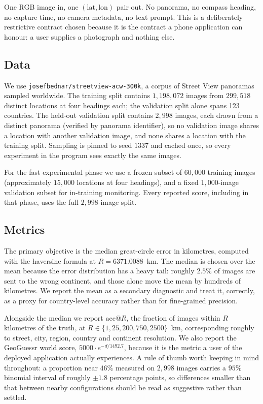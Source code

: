\documentclass[11pt,a4paper]{article}
\begin{document}
One RGB image in, one $(\mathrm{lat}, \mathrm{lon})$ pair out. No panorama, no compass
heading, no capture time, no camera metadata, no text prompt. This is a deliberately
restrictive contract chosen because it is the contract a phone application can honour:
a user supplies a photograph and nothing else.

\subsection{Data}

We use \texttt{josefbednar/streetview-acw-300k}, a corpus of Street View panoramas sampled
worldwide. The training split contains $1{,}198{,}072$ images from $299{,}518$ distinct
locations at four headings each; the validation split alone spans 123 countries. The
held-out validation split contains $2{,}998$ images, each drawn from a distinct panorama
(verified by panorama identifier), so no validation image shares a location with another
validation image, and none shares a location with the training split. Sampling is pinned to
seed $1337$ and cached once, so every experiment in the program sees exactly the same
images.

For the fast experimental phase we use a frozen subset of $60{,}000$ training images
(approximately $15{,}000$ locations at four headings), and a fixed $1{,}000$-image
validation subset for in-training monitoring. Every reported score, including in that phase,
uses the full $2{,}998$-image split.

\subsection{Metrics}

The primary objective is the median great-circle error in kilometres, computed with the
haversine formula at $R = 6371.0088$~km. The median is chosen over the mean because the
error distribution has a heavy tail: roughly $2.5\%$ of images are sent to the wrong
continent, and those alone move the mean by hundreds of kilometres. We report the mean as a
secondary diagnostic and treat it, correctly, as a proxy for country-level accuracy rather
than for fine-grained precision.

Alongside the median we report $\mathrm{acc@}R$, the fraction of images within $R$
kilometres of the truth, at $R \in \{1, 25, 200, 750, 2500\}$~km, corresponding roughly to
street, city, region, country and continent resolution. We also report the GeoGuessr world
score, $5000 \cdot e^{-d/1492.7}$, because it is the metric a user of the deployed
application actually experiences. A rule of thumb worth keeping in mind throughout: a
proportion near $46\%$ measured on $2{,}998$ images carries a $95\%$ binomial interval of
roughly $\pm 1.8$ percentage points, so differences smaller than that between nearby
configurations should be read as suggestive rather than settled.
\end{document}
